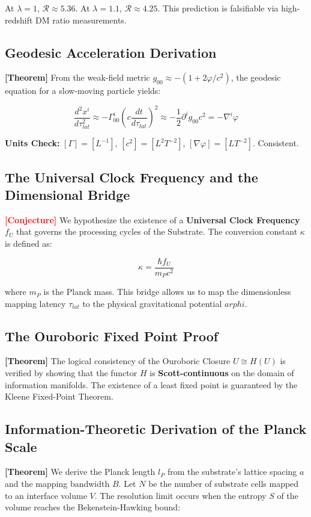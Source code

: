 \documentclass[11pt,titlepage]{article}
\newcommand{\tagtheo}{\textcolor{green!60!black}{\textbf{[Theorem]}} }
\newcommand{\tagconj}{\textcolor{red}{\textbf{[Conjecture]}} }
\begin{document}
At $\lambda=1$, $\mathcal{R} \approx 5.36$. At $\lambda=1.1$, $\mathcal{R} \approx 4.25$. This prediction is falsifiable via high-redshift DM ratio measurements.

\subsection{Geodesic Acceleration Derivation}
\tagtheo From the weak-field metric $g_{00} \approx -(1 + 2\varphi/c^2)$, the geodesic equation for a slow-moving particle yields:

\begin{equation}
\frac{d^2 x^i}{d\tau_{lat}^2} \approx -\Gamma^i_{00} (c \frac{dt}{d\tau_{lat}})^2 \approx -\frac{1}{2} \partial^i g_{00} c^2 = -\nabla^i \varphi
\end{equation}

\textbf{Units Check:} $[\Gamma] = [L^{-1}]$, $[c^2] = [L^2 T^{-2}]$, $[\nabla \varphi] = [L T^{-2}]$. Consistent.

\subsection{The Universal Clock Frequency and the Dimensional Bridge}
\tagconj We hypothesize the existence of a \textbf{Universal Clock Frequency} $f_U$ that governs the processing cycles of the Substrate. The conversion constant $\kappa$ is defined as:

\begin{equation}
\kappa = \frac{\hbar f_U}{m_P c^2}
\end{equation}

where $m_P$ is the Planck mass. This bridge allows us to map the dimensionless mapping latency $\tau_{lat}$ to the physical gravitational potential $arphi$.

\subsection{The Ouroboric Fixed Point Proof}
\tagtheo The logical consistency of the Ouroboric Closure $U \cong H(U)$ is verified by showing that the functor $H$ is \textbf{Scott-continuous} on the domain of information manifolds. The existence of a least fixed point is guaranteed by the Kleene Fixed-Point Theorem.

\subsection{Information-Theoretic Derivation of the Planck Scale}
\tagtheo We derive the Planck length $l_P$ from the substrate's lattice spacing $a$ and the mapping bandwidth $B$. Let $N$ be the number of substrate cells mapped to an interface volume $V$. The resolution limit occurs when the entropy $S$ of the volume reaches the Bekenstein-Hawking bound:
\end{document}
